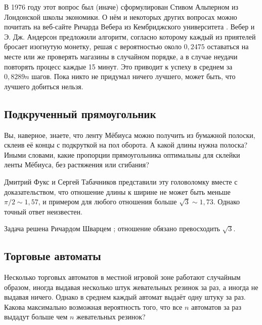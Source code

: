 В 1976 году этот вопрос был (иначе) сформулирован Стивом Альперном из Лондонской школы экономики.
О нём и некоторых других вопросах можно почитать на веб-сайте Ричарда Вебера из Кембриджского университета \cite{weber}.
Вебер и Э. Дж. Андерсон предложили алгоритм, согласно которому каждый из приятелей бросает изогнутую монетку, решая с вероятностью около $0{,}2475$ оставаться на месте или же проверять магазины в случайном порядке, а в случае неудачи повторять процесс каждые 15 минут.
Это приводит к успеху в среднем за $0{,}8289n$ шагов.
Пока никто не придумал ничего лучшего, может быть, что лучшего добиться нельзя.



\subsection*{Подкрученный прямоугольник}

Вы, наверное, знаете, что ленту Мёбиуса можно получить из бумажной полоски, склеив её концы с подкруткой на пол оборота.
А какой длины нужна полоска?
Иными словами, какие пропорции прямоугольника оптимальны для склейки ленты Мёбиуса, без растяжения или сгибания?

Дмитрий Фукс и Сергей Табачников представили эту головоломку \cite[Лекция 14]{19} вместе с доказательством, что отношение длины к ширине не может быть меньше $\pi/2 \sim 1{,}57$, и примером для любого отношения больше $\sqrt{3} \sim 1{,}73$.
Однако точный ответ неизвестен.

\begin{addedbytheeditors}
Задача решена Ричардом Шварцем \cite{schwartz}; отношение обязано превосходить $\sqrt{3}$.
\pr
\end{addedbytheeditors}


\subsection*{Торговые автоматы}

Несколько торговых автоматов в местной игровой зоне работают случайным образом,
иногда выдавая несколько штук жевательных резинок за раз, а иногда не выдавая ничего.
Однако в среднем каждый автомат выдаёт одну штуку за раз.
Какова максимально возможная вероятность того, что все $n$ автоматов за раз выдадут больше чем $n$ жевательных резинок?

